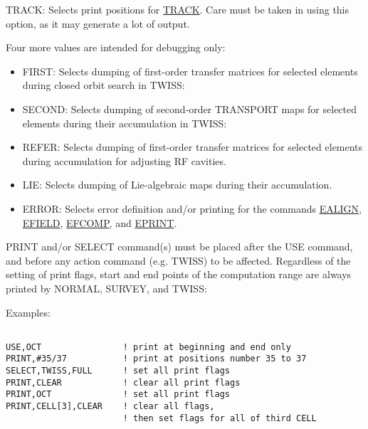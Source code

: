 TRACK: Selects print positions for \href{track.html}{TRACK}. Care must be taken in using this option, as it may generate a lot of output. 

 Four more values are intended for debugging only: 
\begin{itemize}
	\item FIRST: Selects dumping of first-order transfer matrices for selected elements during closed orbit search in TWISS: 
	\item SECOND: Selects dumping of second-order TRANSPORT maps for selected elements during their accumulation in TWISS: 
	\item REFER: Selects dumping of first-order transfer matrices for selected elements during accumulation for adjusting RF cavities. 
	\item LIE: Selects dumping of Lie-algebraic maps during their accumulation. 
	\item ERROR: Selects error definition and/or printing for the commands \href{error_align.html}{EALIGN},  \href{error_field.html}{EFIELD},  \href{error_field.html}{EFCOMP}, and  \href{error_print.html}{EPRINT}. 
\end{itemize} PRINT and/or SELECT command(s) must be placed after the USE command, and before any action command (e.g. TWISS) to be affected. Regardless of the setting of print flags, start and end points of the computation range are always printed by NORMAL, SURVEY, and TWISS: 

 Examples: 
\begin{verbatim}

USE,OCT                ! print at beginning and end only
PRINT,#35/37           ! print at positions number 35 to 37
SELECT,TWISS,FULL      ! set all print flags
PRINT,CLEAR            ! clear all print flags
PRINT,OCT              ! set all print flags
PRINT,CELL[3],CLEAR    ! clear all flags,
                       ! then set flags for all of third CELL
\end{verbatim}

